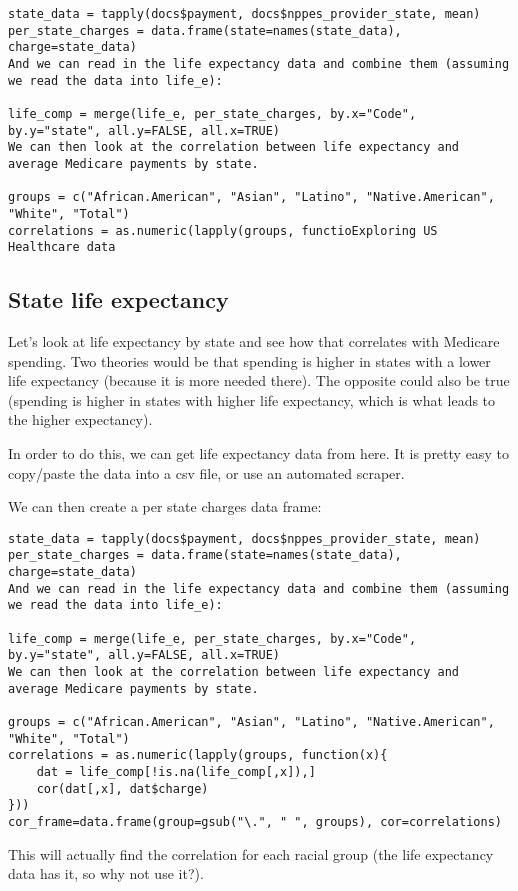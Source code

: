 \begin{framed}
\begin{verbatim}
state_data = tapply(docs$payment, docs$nppes_provider_state, mean)
per_state_charges = data.frame(state=names(state_data), charge=state_data)
And we can read in the life expectancy data and combine them (assuming we read the data into life_e):

life_comp = merge(life_e, per_state_charges, by.x="Code", by.y="state", all.y=FALSE, all.x=TRUE)
We can then look at the correlation between life expectancy and average Medicare payments by state.

groups = c("African.American", "Asian", "Latino", "Native.American", "White", "Total")
correlations = as.numeric(lapply(groups, functioExploring US Healthcare data

\end{verbatim}

\subsection*{State life expectancy}
Let's look at life expectancy by state and see how that correlates with Medicare spending. Two theories would be that spending is higher in states with a lower life expectancy (because it is more needed there). The opposite could also be true (spending is higher in states with higher life expectancy, which is what leads to the higher expectancy).

In order to do this, we can get life expectancy data from here. It is pretty easy to copy/paste the data into a csv file, or use an automated scraper.

We can then create a per state charges data frame:
\begin{framed}
\begin{verbatim}
state_data = tapply(docs$payment, docs$nppes_provider_state, mean)
per_state_charges = data.frame(state=names(state_data), charge=state_data)
And we can read in the life expectancy data and combine them (assuming we read the data into life_e):

life_comp = merge(life_e, per_state_charges, by.x="Code", by.y="state", all.y=FALSE, all.x=TRUE)
We can then look at the correlation between life expectancy and average Medicare payments by state.

groups = c("African.American", "Asian", "Latino", "Native.American", "White", "Total")
correlations = as.numeric(lapply(groups, function(x){
	dat = life_comp[!is.na(life_comp[,x]),]
	cor(dat[,x], dat$charge)
}))
cor_frame=data.frame(group=gsub("\.", " ", groups), cor=correlations)
\end{verbatim}
\end{framed}
This will actually find the correlation for each racial group (the life expectancy data has it, so why not use it?).


\end{framed}
